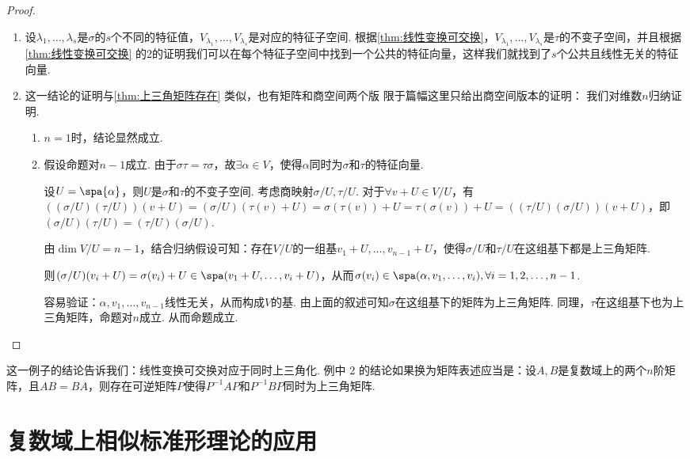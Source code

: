 \begin{proof}
    \begin{enumerate}
        \item 设$\lambda_1,\ldots,\lambda_s$是$\sigma$的$s$个不同的特征值，$V_{\lambda_1},\ldots,V_{\lambda_s}$是对应的特征子空间. 根据\autoref{thm:线性变换可交换}，$V_{\lambda_1},\ldots,V_{\lambda_s}$是$\tau$的不变子空间，并且根据\autoref{thm:线性变换可交换} 的2的证明我们可以在每个特征子空间中找到一个公共的特征向量，这样我们就找到了$s$个公共且线性无关的特征向量.

        \item 这一结论的证明与\autoref{thm:上三角矩阵存在} 类似，也有矩阵和商空间两个版
        限于篇幅这里只给出商空间版本的证明：
        我们对维数$n$归纳证明.
        \begin{enumerate}
            \item $n=1$时，结论显然成立.
            \item 假设命题对$n-1$成立. 由于$\sigma \tau=\tau \sigma$，故$\exists \alpha\in V$，使得$\alpha$同时为$\sigma$和$\tau$的特征向量.

            设$U=\spa{\alpha}$，则$U$是$\sigma$和$\tau$的不变子空间. 考虑商映射$\sigma/U,\tau/U$.
            对于$\forall v+U\in V/U$，有$((\sigma/U)(\tau/U))(v+U)=(\sigma/U)(\tau(v)+U)=\sigma(\tau(v))+U=\tau(\sigma(v))+U=((\tau/U)(\sigma/U))(v+U)$，即$(\sigma/U)(\tau/U)=(\tau/U)(\sigma/U)$.

            由$\dim V/U=n-1$，结合归纳假设可知：存在$V/U$的一组基$v_1+U,\ldots,v_{n-1}+U$，使得$\sigma/U$和$\tau/U$在这组基下都是上三角矩阵.

            则$(\sigma/U)(v_i+U)=\sigma(v_i)+U \in \spa(v_1+U,\ldots,v_i+U)$，从而$\sigma(v_i)\in \spa(\alpha,v_1,\ldots,v_i),\forall i=1,2,\ldots,n-1$.

            容易验证：$\alpha,v_1,\ldots,v_{n-1}$线性无关，从而构成$V$的基. 由上面的叙述可知$\sigma$在这组基下的矩阵为上三角矩阵. 同理，$\tau$在这组基下也为上三角矩阵，命题对$n$成立. 从而命题成立.
        \end{enumerate}
    \end{enumerate}
\end{proof}

这一例子的结论告诉我们：线性变换可交换对应于同时上三角化. 例中 2 的结论如果换为矩阵表述应当是：设$A,B$是复数域上的两个$n$阶矩阵，且$AB=BA$，则存在可逆矩阵$P$使得$P^{-1}AP$和$P^{-1}BP$同时为上三角矩阵.

\section{复数域上相似标准形理论的应用}


